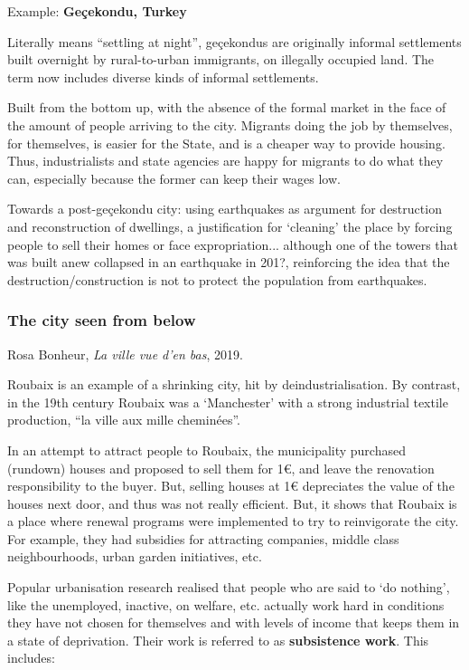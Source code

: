 \documentclass{article}
\begin{document}
Example: \textbf{Geçekondu, Turkey}

Literally means ``settling at night'', geçekondus are originally informal settlements built overnight by rural-to-urban immigrants, on illegally occupied land. The term now includes diverse kinds of informal settlements.

Built from the bottom up, with the absence of the formal market in the face of the amount of people arriving to the city. Migrants doing the job by themselves, for themselves, is easier for the State, and is a cheaper way to provide housing.
Thus, industrialists and state agencies are happy for migrants to do what they can, especially because the former can keep their wages low.

Towards a post-geçekondu city: using earthquakes as argument for destruction and reconstruction of dwellings, a justification for `cleaning' the place by forcing people to sell their homes or face expropriation... although one of the towers that was built anew collapsed in an earthquake in 201?, reinforcing the idea that the destruction/construction is not to protect the population from earthquakes.

\subsubsection{The city seen from below}

Rosa Bonheur, \textit{La ville vue d'en bas}, 2019.

Roubaix is an example of a shrinking city, hit by deindustrialisation. By contrast, in the 19th century Roubaix was a `Manchester' with a strong industrial textile production, ``la ville aux mille cheminées''. 

In an attempt to attract people to Roubaix, the municipality purchased (rundown) houses and proposed to sell them for 1€, and leave the renovation responsibility to the buyer. But, selling houses at 1€ depreciates the value of the houses next door, and thus was not really efficient. But, it shows that Roubaix is a place where renewal programs were implemented to try to reinvigorate the city. For example, they had subsidies for attracting companies, middle class neighbourhoods, urban garden initiatives, etc.

Popular urbanisation research realised that people who are said to `do nothing', like the unemployed, inactive, on welfare, etc. actually work hard in conditions they have not chosen for themselves and with levels of income that keeps them in a state of deprivation. Their work is referred to as \textbf{subsistence work}. This includes:
\end{document}
